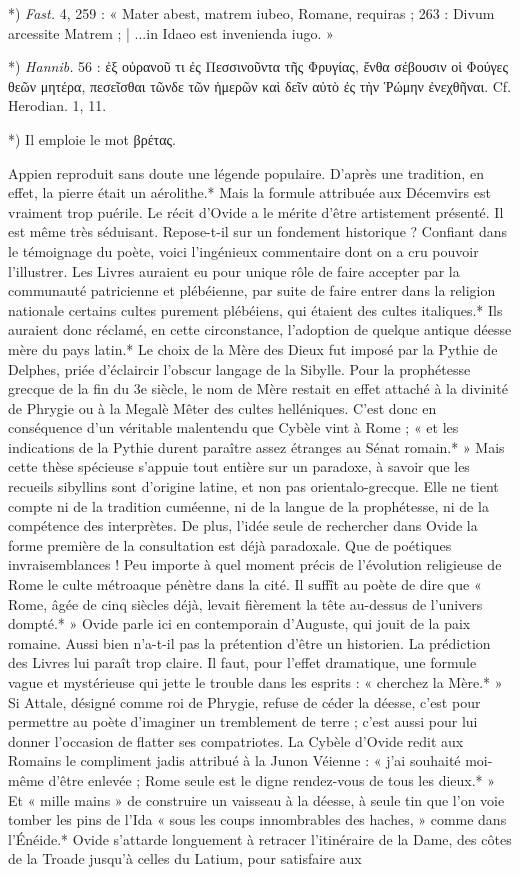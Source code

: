 \documentclass[a4paper, 11pt, oneside, polutonikogreek, french]{article}
\begin{document}
*) \emph{Fast.} 4, 259 : « Mater abest, matrem iubeo, Romane, requiras ; 263 : Divum arcessite Matrem ; | ...in Idaeo est invenienda iugo. »

*) \emph{Hannib.} 56 : ἐξ οὐρανοῦ τι ἐς Πεσσινοῦντα τῆς Φρυγίας, ἔνθα σέβουσιν οἱ Φούγες θεῶν μητέρα, πεσεῖσθαι τῶνδε τῶν ἡμερῶν καὶ δεῖν αὐτὸ ἐς τὴν Ῥώμην ἐνεχθῆναι. Cf. Herodian. 1, 11.

*) Il emploie le mot βρέτας.

Appien reproduit sans doute une légende populaire. D'après une tradition, en effet, la pierre était un aérolithe.* Mais la formule attribuée aux Décemvirs est vraiment trop puérile. Le récit d'Ovide a le mérite d'être artistement présenté. Il est même très séduisant. Repose-t-il sur un fondement historique ? Confiant dans le témoignage du poète, voici l'ingénieux commentaire dont on a cru pouvoir l'illustrer. Les Livres auraient eu pour unique rôle de faire accepter par la communauté patricienne et plébéienne, par suite de faire entrer dans la religion nationale certains cultes purement plébéiens, qui étaient des cultes italiques.* Ils auraient donc réclamé, en cette circonstance, l'adoption de quelque antique déesse mère du pays latin.* Le choix de la Mère des Dieux fut imposé par la Pythie de Delphes, priée d'éclaircir l'obscur langage de la Sibylle. Pour la prophétesse grecque de la fin du 3e siècle, le nom de Mère restait en effet attaché à la divinité de Phrygie ou à la Megalè Mêter des cultes helléniques. C'est donc en conséquence d'un véritable malentendu que Cybèle vint à Rome ; « et les indications de la Pythie durent paraître assez étranges au Sénat romain.* » Mais cette thèse spécieuse s'appuie tout entière sur un paradoxe, à savoir que les recueils sibyllins sont d'origine latine, et non pas orientalo-grecque. Elle ne tient compte ni de la tradition cuméenne, ni de la langue de la prophétesse, ni de la compétence des interprètes. De plus, l'idée seule de rechercher dans Ovide la forme première de la consultation est déjà paradoxale. Que de poétiques invraisemblances ! Peu importe à quel moment précis de l'évolution religieuse de Rome le culte métroaque pénètre dans la cité. Il suffît au poète de dire que « Rome, âgée de cinq siècles déjà, levait fièrement la tête au-dessus de l'univers dompté.* » Ovide parle ici en contemporain d'Auguste, qui jouit de la paix romaine. Aussi bien n'a-t-il pas la prétention d'être un historien. La prédiction des Livres lui paraît trop claire. Il faut, pour l'effet dramatique, une formule vague et mystérieuse qui jette le trouble dans les esprits : « cherchez la Mère.* » Si Attale, désigné comme roi de Phrygie, refuse de céder la déesse, c'est pour permettre au poète d'imaginer un tremblement de terre ; c'est aussi pour lui donner l'occasion de flatter ses compatriotes. La Cybèle d'Ovide redit aux Romains le compliment jadis attribué à la Junon Véienne : « j'ai souhaité moi-même d'être enlevée ; Rome seule est le digne rendez-vous de tous les dieux.* » Et « mille mains » de construire un vaisseau à la déesse, à seule tin que l'on voie tomber les pins de l'Ida « sous les coups innombrables des haches, » comme dans l'Énéide.* Ovide s'attarde longuement à retracer l'itinéraire de la Dame, des côtes de la Troade jusqu'à celles du Latium, pour satisfaire aux 
\end{document}
